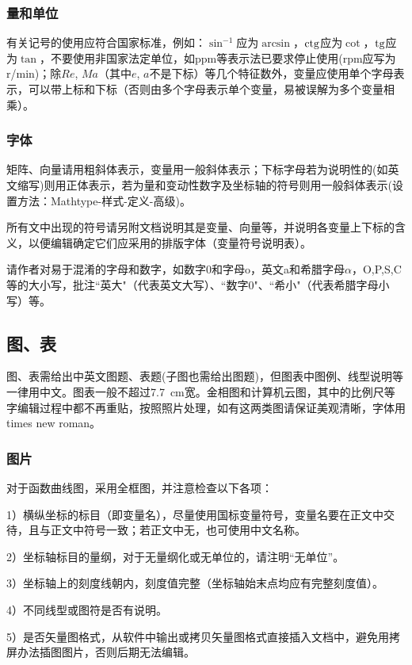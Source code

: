 \documentclass[10.5pt,twocolumn]{jbuaa}
\begin{document}
\subsubsection{量和单位}
有关记号的使用应符合国家标准，例如：$\sin^{-1}$应为$\arcsin$，$\rm ctg$应为$\cot$，$\rm tg$应为$\tan$，不要使用非国家法定单位，如ppm等表示法已要求停止使用(rpm应写为r/min)；除$Re$, $Ma$（其中$e$, $a$不是下标）等几个特征数外，变量应使用单个字母表示，可以带上标和下标（否则由多个字母表示单个变量，易被误解为多个变量相乘）。

\subsubsection{字体}
矩阵、向量请用粗斜体表示，变量用一般斜体表示；下标字母若为说明性的(如英文缩写)则用正体表示，若为量和变动性数字及坐标轴的符号则用一般斜体表示(设置方法：Mathtype-样式-定义-高级)。

所有文中出现的符号请另附文档说明其是变量、向量等，并说明各变量上下标的含义，以便编辑确定它们应采用的排版字体（变量符号说明表）。

请作者对易于混淆的字母和数字，如数字0和字母o，英文a和希腊字母$\alpha$，O,P,S,C等的大小写，批注``英大"（代表英文大写）、``数字0"、``希小"（代表希腊字母小写）等。

\subsection{图、表}
图、表需给出中英文图题、表题(子图也需给出图题)，但图表中图例、线型说明等一律用中文。图表一般不超过7.7\ cm宽。金相图和计算机云图，其中的比例尺等字编辑过程中都不再重贴，按照照片处理，如有这两类图请保证美观清晰，字体用times new roman。

\subsubsection{图片}
对于函数曲线图，采用全框图，并注意检查以下各项：

1）横纵坐标的标目（即变量名），尽量使用国标变量符号，变量名要在正文中交待，且与正文中符号一致；若正文中无，也可使用中文名称。

2）坐标轴标目的量纲，对于无量纲化或无单位的，请注明``无单位”。

3）坐标轴上的刻度线朝内，刻度值完整（坐标轴始末点均应有完整刻度值）。

4）不同线型或图符是否有说明。

5）是否矢量图格式，从软件中输出或拷贝矢量图格式直接插入文档中，避免用拷屏办法插图图片，否则后期无法编辑。
\end{document}
